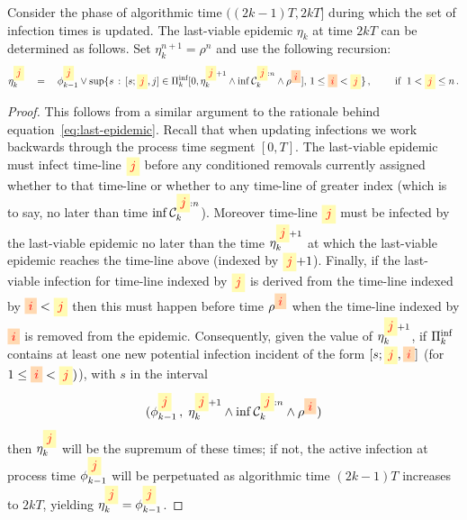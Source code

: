 \documentclass[]{article}
\newcommand{\Conditioned}{\mathcal{C}}
\newcommand{\Poisson}{\Pi}
\newcommand{\PoissonInf}{\Poisson^\textup{inf}}
\newcommand{\infectee}{{\colorbox{yellow!30}{$\textcolor{red}{j}$}}}
\newcommand{\infector}{{\colorbox{orange!30}{$\textcolor{red}{i}$}}}
\begin{document}
\begin{lem}\label{lem:update_last-viable}
Consider the phase of algorithmic time \(((2k{-}1)T, 2kT]\) during
which the set of infection times is updated.
The last-viable epidemic $\eta_k$ at time \(2kT\) can be determined as follows.
Set \(\eta^{n+1}_k = \rho^n\) and use the following recursion:
\begin{equation}
 \label{eq:update_last-viable}
\eta^\infectee_k  \quad=\quad
\phi^\infectee_{k-1} \vee 
\sup \{s\,:\, 
[s;\infectee,j] \in \PoissonInf_k [0, \eta^{\infectee{+}1}_k
	\wedge \inf\Conditioned^{\infectee:n}_k 
	\wedge \rho^\infector]
		,\,1\le \infector<\infectee \}\,,  
\qquad \text{ if }\;1<\infectee\le n \,.
\end{equation}
\end{lem}

\begin{proof}
This follows from a similar argument to the rationale behind equation~\eqref{eq:last-epidemic}. 
Recall that when updating infections we work backwards through the process time segment \([0,T]\).
The last-viable epidemic must infect time-line \(\infectee\) 
before any conditioned removals currently assigned whether to that time-line or 
whether
to any time-line of greater index
(which is to say, no later than time \(\inf\Conditioned^{\infectee:n}_k\)).
Moreover time-line \(\infectee\) must be infected by the last-viable epidemic
no later than the time \(\eta^{\infectee{+}1}_k\) at which 
the last-viable epidemic reaches the time-line above (indexed by \(\infectee{+}1\)). 
Finally, if the last-viable infection for time-line indexed by \(\infectee\)
is derived from the time-line indexed by \(\infector<\infectee\) then this must happen
before time \(\rho^\infector\) when
the time-line indexed by \(\infector\) is removed from the epidemic.
Consequently, given the value of \(\eta^{\infectee{+}1}_k\), 
if \(\PoissonInf_k\) contains at least one new potential infection incident of the form
\([s;\infectee,\infector]\) (for \(1\leq \infector<\infectee)\)), with \(s\) in the interval 
\[
(\phi^\infectee_{k-1}\,,\;\eta^{\infectee{+}1}_k \wedge  \inf\Conditioned^{\infectee:n}_k\wedge \rho^\infector) 
\]
then \(\eta^\infectee_k\) will be the supremum of these times;
if not, the active infection at process time \(\phi^\infectee_{k-1}\) 
will be perpetuated as algorithmic time \((2k{-}1)T\) increases to \(2kT\), 
yielding \(\eta^\infectee_k = \phi^\infectee_{k-1}\).
\end{proof}
\end{document}
